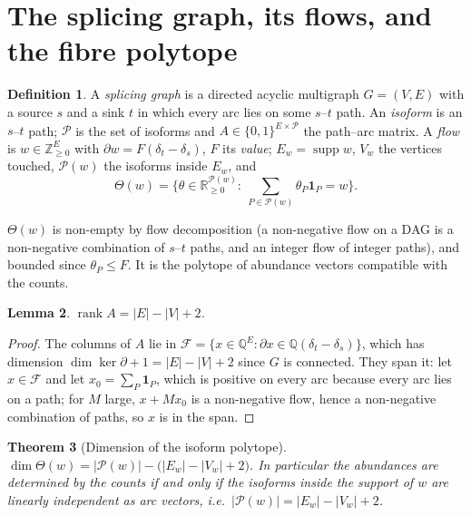 \documentclass[11pt]{article}
\theoremstyle{plain}
\newtheorem{theorem}{Theorem}
\newtheorem{lemma}[theorem]{Lemma}
\theoremstyle{definition}
\newtheorem{definition}[theorem]{Definition}
\theoremstyle{remark}
\newcommand{\Z}{\mathbb{Z}}
\newcommand{\Q}{\mathbb{Q}}
\newcommand{\R}{\mathbb{R}}
\newcommand{\rank}{\operatorname{rank}}
\newcommand{\supp}{\operatorname{supp}}
\newcommand{\Th}{\Theta}
\begin{document}
\section{The splicing graph, its flows, and the fibre polytope}\label{sec:dim}

\begin{definition}
A \emph{splicing graph} is a directed acyclic multigraph $G=(V,E)$ with a source $s$ and a
sink $t$ in which every arc lies on some $s$--$t$ path. An \emph{isoform} is an $s$--$t$
path; $\mathcal P$ is the set of isoforms and $A\in\{0,1\}^{E\times\mathcal P}$ the
path--arc matrix. A \emph{flow} is $w\in\Z^E_{\ge0}$ with $\partial w=F(\delta_t-\delta_s)$,
$F$ its \emph{value}; $E_w=\supp w$, $V_w$ the vertices touched, $\mathcal P(w)$ the isoforms
inside $E_w$, and
\[
  \Th(w)=\Big\{\theta\in\R_{\ge0}^{\mathcal P(w)}:\ \sum_{P\in\mathcal P(w)}\theta_P\mathbf 1_P=w\Big\}.
\]
\end{definition}

$\Th(w)$ is non-empty by flow decomposition (a non-negative flow on a DAG is a non-negative
combination of $s$--$t$ paths, and an integer flow of integer paths), and bounded since
$\theta_P\le F$. It is the polytope of abundance vectors compatible with the counts.

\begin{lemma}\label{lem:rank}
$\rank A=|E|-|V|+2$.
\end{lemma}

\begin{proof}
The columns of $A$ lie in $\mathcal F=\{x\in\Q^E:\partial x\in\Q(\delta_t-\delta_s)\}$,
which has dimension $\dim\ker\partial+1=|E|-|V|+2$ since $G$ is connected. They span it:
let $x\in\mathcal F$ and let $x_0=\sum_P\mathbf 1_P$, which is positive on every arc because
every arc lies on a path; for $M$ large, $x+Mx_0$ is a non-negative flow, hence a
non-negative combination of paths, so $x$ is in the span.
\end{proof}

\begin{theorem}[Dimension of the isoform polytope]\label{thm:dim}
$\dim\Th(w)=|\mathcal P(w)|-\big(|E_w|-|V_w|+2\big)$. In particular the abundances are
determined by the counts if and only if the isoforms inside the support of $w$ are linearly
independent as arc vectors, i.e.\ $|\mathcal P(w)|=|E_w|-|V_w|+2$.
\end{theorem}
\end{document}
